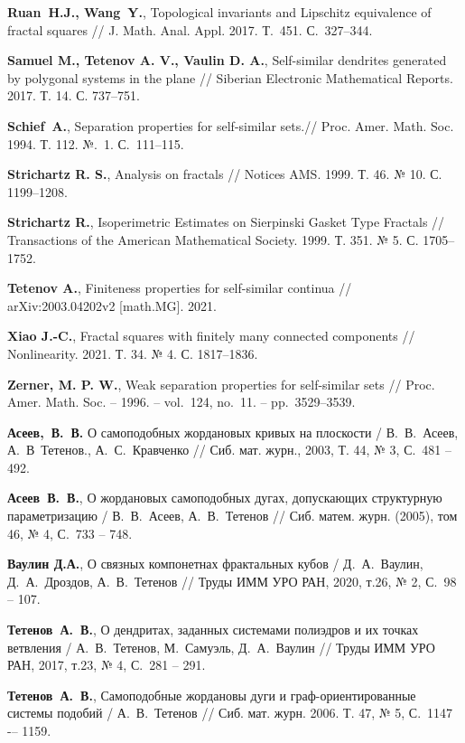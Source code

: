 \begin{thebibliography}{99}
{\bf Ruan~H.J., Wang~Y.},
Topological invariants and Lipschitz equivalence of fractal squares //
J. Math. Anal. Appl.  2017. Т.~451. С.~327--344.

{\bf Samuel M., Tetenov A. V., Vaulin D. A.},
Self-similar dendrites generated by polygonal systems in the plane //
Siberian Electronic Mathematical Reports. 2017. Т. 14. С. 737--751.

{\bf Schief~A.},  Separation properties for self-similar sets.// 
Proc. Amer. Math. Soc. 1994. Т. 112. №.~1. С.~111--115.

{\bf Strichartz R. S.},
Analysis on fractals // 
Notices AMS. 1999. Т. 46. № 10. С. 1199--1208.

{\bf Strichartz R.},
Isoperimetric Estimates on Sierpinski Gasket Type Fractals // 
Transactions of the American Mathematical Society. 1999. Т. 351. № 5. С. 1705--1752.

{\bf Tetenov A.},
Finiteness properties for self-similar continua // 
arXiv:2003.04202v2 [math.MG]. 2021.

{\bf Xiao J.-C.},
Fractal squares with finitely many connected components // 
Nonlinearity. 2021. Т. 34. № 4. С. 1817--1836.

{\bf Zerner, M. P. W.},
Weak separation properties for self-similar sets // 
Proc. Amer. Math. Soc.  -- 1996. -- vol.~124, no.~11. -- pp.~3529--3539.

{\bf Асеев,~В.~В.} 
О самоподобных жордановых кривых на плоскости / 
В.~В.~Асеев, А.~В~Тетенов., А.~С.~Кравченко //
Сиб. мат. журн., 2003, Т. 44, № 3, С.~481 -- 492.

{\bf Асеев~В.~В.},
О жордановых самоподобных дугах, допускающих структурную параметризацию /
В.~В.~Асеев, А.~В.~Тетенов //
Сиб. матем. журн. (2005), том 46, № 4, С.~733 -- 748.

{\bf Ваулин Д.А.},
О связных компонетнах фрактальных кубов / 
Д.~А.~Ваулин, Д.~А.~Дроздов, А.~В.~Тетенов //
Труды ИММ УРО РАН, 2020, т.26, № 2, С.~98 -- 107.

{\bf Тетенов~А.~В.},  
О дендритах, заданных системами полиэдров и их точках ветвления /
А.~В.~Тетенов, М.~Самуэль, Д.~А.~Ваулин // 
Труды ИММ УРО РАН, 2017, т.23, № 4, С.~281 -- 291.

{\bf Тетенов~А.~В.},
Самоподобные жордановы дуги и граф-ориентированные системы подобий /
А.~В.~Тетенов //
Сиб. мат. журн. 2006. Т. 47, № 5, С.~1147 -– 1159.


\end{thebibliography}
